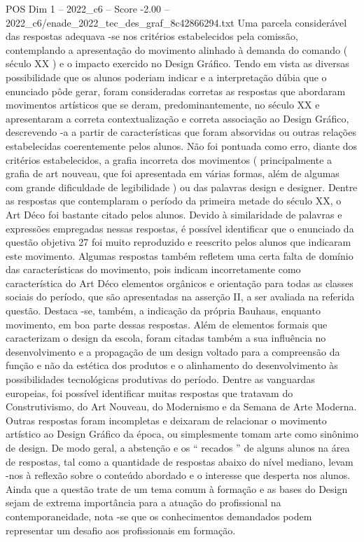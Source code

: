 \begin{textsample}{POS Dim 1 – 2022\_c6 – Score -2.00 – 2022\_c6/enade\_2022\_tec\_des\_graf\_8c42866294.txt}
Uma parcela considerável das respostas adequava -se nos critérios estabelecidos pela comissão, contemplando a apresentação do movimento alinhado à demanda do comando ( século XX ) e o impacto exercido no Design Gráfico.
Tendo em vista as diversas possibilidade que os alunos poderiam indicar e a interpretação dúbia que o enunciado pôde gerar, foram consideradas corretas as respostas que abordaram movimentos artísticos que se deram, predominantemente, no século XX e apresentaram a correta contextualização e correta associação ao Design Gráfico, descrevendo -a a partir de características que foram absorvidas ou outras relações estabelecidas coerentemente pelos alunos.
Não foi pontuada como erro, diante dos critérios estabelecidos, a grafia incorreta dos movimentos ( principalmente a grafia de art nouveau, que foi apresentada em várias formas, além de algumas com grande dificuldade de legibilidade ) ou das palavras design e designer.
Dentre as respostas que contemplaram o período da primeira metade do século XX, o Art Déco foi bastante citado pelos alunos.
Devido à similaridade de palavras e expressões empregadas nessas respostas, é possível identificar que o enunciado da questão objetiva 27 foi muito reproduzido e reescrito pelos alunos que indicaram este movimento.
Algumas respostas também refletem uma certa falta de domínio das características do movimento, pois indicam incorretamente como característica do Art Déco elementos orgânicos e orientação para todas as classes sociais do período, que são apresentadas na asserção II, a ser avaliada na referida questão.
Destaca -se, também, a indicação da própria Bauhaus, enquanto movimento, em boa parte dessas respostas.
Além de elementos formais que caracterizam o design da escola, foram citadas também a sua influência no desenvolvimento e a propagação de um design voltado para a compreensão da função e não da estética dos produtos e o alinhamento do desenvolvimento às possibilidades tecnológicas produtivas do período.
Dentre as vanguardas europeias, foi possível identificar muitas respostas que tratavam do Construtivismo, do Art Nouveau, do Modernismo e da Semana de Arte Moderna.
Outras respostas foram incompletas e deixaram de relacionar o movimento artístico ao Design Gráfico da época, ou simplesmente tomam arte como sinônimo de design.
De modo geral, a abstenção e os “ recados ” de alguns alunos na área de respostas, tal como a quantidade de respostas abaixo do nível mediano, levam -nos à reflexão sobre o conteúdo abordado e o interesse que desperta nos alunos.
Ainda que a questão trate de um tema comum à formação e as bases do Design sejam de extrema importância para a atuação do profissional na contemporaneidade, nota -se que os conhecimentos demandados podem representar um desafio aos profissionais em formação.

\end{textsample}
